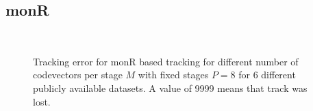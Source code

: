 \subsection{monR}
\begin{figure}[h!]
\centering
\\
\caption{Tracking error for monR based tracking for different number of codevectors per stage $M$ with fixed stages $P=8$ for 6 different publicly available datasets. A value of 9999 means that track was lost.}
\label{fig:trk_monR}
\end{figure}

